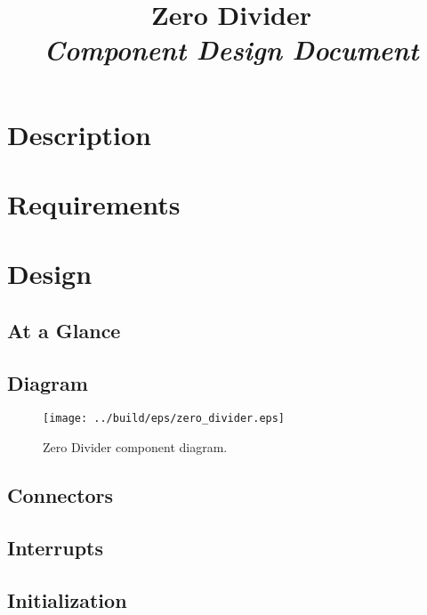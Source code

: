 



\title{\textbf{Zero Divider} \\
\large\textit{Component Design Document}}
\date{}
\maketitle

\section{Description}


\section{Requirements}


\section{Design}

\subsection{At a Glance}


\subsection{Diagram}
\begin{figure}[H]
  \texttt{[image: ../build/eps/zero\_divider.eps]}
  \caption{Zero Divider component diagram.}
\end{figure}

\subsection{Connectors}


\subsection{Interrupts}



\subsection{Initialization}


